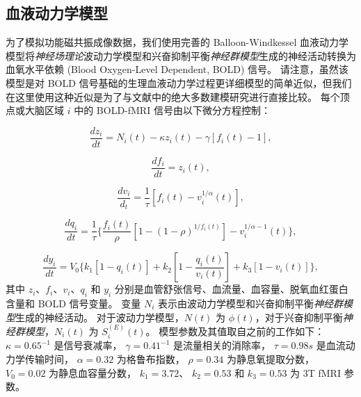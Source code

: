 \documentclass[lang=cn,a4paper,newtx,citestyle=gb7714-2015, bibstyle=gb7714-2015]{elegantpaper}
\begin{document}
\subsection{血液动力学模型} \label{sec:haemodynamic_model}

为了模拟功能磁共振成像数据，我们使用完善的 Balloon-Windkessel 血液动力学模型将\textit{神经场理论}波动力学模型和兴奋抑制平衡\textit{神经群模型}生成的神经活动转换为血氧水平依赖 (Blood Oxygen-Level Dependent, BOLD) 信号\cite{stephan2007comparing}。
请注意，虽然该模型是对 BOLD 信号\cite{aquino2012hemodynamic,pang2017effects,pang2018biophysically}基础的生理血液动力学过程更详细模型的简单近似，但我们在这里使用这种近似是为了与文献中的绝大多数建模研究进行直接比较\cite{deco2021dynamical,demirtacs2019hierarchical,aquino2022intersection,deco2009key,cabral2014exploring}。
每个顶点或大脑区域 $ i $ 中的 BOLD-fMRI 信号由以下微分方程控制：

\begin{equation}\label{eq:vasodilatory_signal}
	\frac{dz_i}{dt} = N_i (t) - 
					  \kappa z_i(t) - 
					  \gamma [f_i(t) - 1], 
\end{equation}


\begin{equation}\label{eq:blood_inflow}
	\frac{df_i}{dt} = z_i(t),
\end{equation}


\begin{equation}\label{eq:blood_volume}
	\frac{dv_i}{d_t} = \frac{1}{\tau} [f_i(t) - v_i^{1/\alpha} (t)],
\end{equation}


\begin{equation}\label{eq:deoxyhaemoglobin}
	\frac{dq_i}{dt} = \frac{1}{\tau}
					\{
					\frac{f_i(t)}{\rho}
					[1 - (1-\rho)^{1/f_i(t)}]
						- v_i^{1/\alpha - 1} (t)
					\},
\end{equation}


\begin{equation}\label{eq:BOLD_signal}
	\frac{dy_i}{dt} = V_0
					\{
						k_1 [1 - q_i(t)] +
						k_2 [1 - \frac{q_i(t)}{v_i(t)}] + 
						k_3 [1 - v_i(t)]
					\},
\end{equation}
%
其中 $ z_i $、$ f_i $、$ v_i $、$ q_i $ 和 $ y_i $ 分别是血管舒张信号、血流量、血容量、脱氧血红蛋白含量和 BOLD 信号变量。
变量 $ N_i $ 表示由波动力学模型和兴奋抑制平衡\textit{神经群模型}生成的神经活动。
对于波动力学模型，$ N(t) $ 为 $ \phi (t) $，对于兴奋抑制平衡\textit{神经群模型}，$ N_i (t) $ 为 $ S_i^{(E)} (t) $。
模型参数及其值取自之前的工作\cite{stephan2007comparing,heinzle2016hemodynamic}如下：
$ \kappa = 0.65^{-1} $ 是信号衰减率，
$ \gamma = 0.41^{-1} $ 是流量相关的消除率，
$ \tau = 0.98 s $ 是血流动力学传输时间，
$ \alpha = 0.32 $ 为格鲁布指数，
$ \rho = 0.34 $ 为静息氧提取分数，
$ V_0 = 0.02 $ 为静息血容量分数，
$ k_1 = 3.72 $、
$ k_2 = 0.53 $ 
和 $ k_3 = 0.53 $ 为 3T fMRI 参数。
\end{document}
